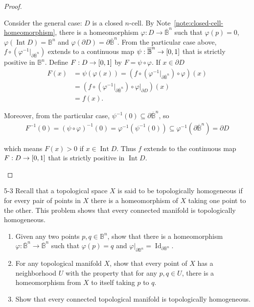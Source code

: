 \begin{proof}
\begin{enumerate}[label={(\alph*)}]
		      Consider the general case: \( D \) is a closed \( n \)-cell. By Note~\ref{note:closed-cell-homeomorphism}, there is a homeomorphism \( \varphi: D \to \overline{\mathbb{B}}^{n} \) such that \( \varphi(p) = 0 \), \( \varphi(\operatorname{Int} D) = \mathbb{B}^{n} \) and \( \varphi(\partial D) = \partial\overline{\mathbb{B}}^{n} \). From the particular case above, \( f\circ (\varphi^{-1}\vert_{\partial\overline{\mathbb{B}}^{n}}) \) extends to a continuous map \( \psi: \overline{\mathbb{B}}^{n} \to \left[{0, 1}\right] \) that is strictly positive in \( \mathbb{B}^{n} \). Define \( F: D \to \left[{0, 1}\right] \) by \( F = \psi \circ \varphi \). If \( x \in \partial D \)
		      \begin{align*}
			      F(x) & = \psi(\varphi(x)) = (f\circ (\varphi^{-1}\vert_{\partial\overline{\mathbb{B}}^{n}}) \circ \varphi)(x) \\
			           & = (f \circ (\varphi^{-1}\vert_{\partial\overline{\mathbb{B}}^{n}}) \circ \varphi\vert_{\partial D})(x) \\
			           & = f(x).
		      \end{align*}

		      Moreover, from the particular case, \( \psi^{-1}(0) \subseteq \partial\overline{\mathbb{B}}^{n} \), so
		      \begin{align*}
			      F^{-1}(0) = {(\psi \circ \varphi)}^{-1}(0) = \varphi^{-1}(\psi^{-1}(0)) \subseteq \varphi^{-1}(\partial\overline{\mathbb{B}}^{n}) = \partial D
		      \end{align*}

		      which means \( F(x) > 0 \) if \( x \in \operatorname{Int} D \). Thus \( f \) extends to the continuous map \( F: D \to \left[{0, 1}\right] \) that is strictly positive in \( \operatorname{Int} D \).
	\end{enumerate}
\end{proof}

\begin{problem}{5-3}\label{problem:5-3}
Recall that a topological space \( X \) is said to be topologically homogeneous
if for every pair of points in \( X \) there is a homeomorphism of \( X \) taking one
point to the other. This problem shows that every connected manifold is
topologically homogeneous.
\begin{enumerate}[label={(\alph*)}]
	\item Given any two points \( p, q \in \mathbb{B}^{n} \), show that there is a homeomorphism \( \varphi: \overline{\mathbb{B}}^{n} \to \overline{\mathbb{B}}^{n} \) such that \( \varphi(p) = q \) and \( \varphi\vert_{\partial\mathbb{B}^{n}} = \operatorname{Id}_{\partial\mathbb{B}^{n}} \).
	\item For any topological manifold \( X \), show that every point of \( X \) has a neighborhood \( U \) with the property that for any \( p, q \in U \), there is a homeomorphism from \( X \) to itself taking \( p \) to \( q \).
	\item Show that every connected topological manifold is topologically homogeneous.
\end{enumerate}
\end{problem}

